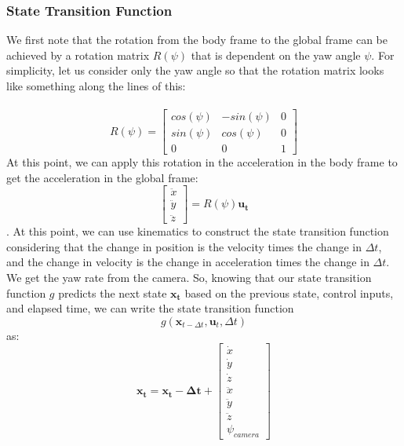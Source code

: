 \documentclass{article}
\begin{document}
\subsubsection{State Transition Function}
We first note that the rotation from the body frame to the global frame can be achieved by a rotation matrix $R(\psi)$ that is dependent on the yaw angle $\psi$. For simplicity, let us consider only the yaw angle so that the rotation matrix looks like something along the lines of this: \\ \\
\begin{equation}
R(\psi) =
\begin{bmatrix}
cos(\psi) & -sin(\psi) & 0 \\
sin(\psi) & cos(\psi) & 0 \\
0 & 0 & 1
\end{bmatrix}
\end{equation}
At this point, we can apply this rotation in the acceleration in the body frame to get the acceleration in the global frame: \\
\begin{equation}
\begin{bmatrix}
\ddot x \\
\ddot y \\
\ddot z
\end{bmatrix}  = R(\psi)\mathbf{u_t}
\end{equation}. At this point, we can use kinematics to construct the state transition function considering that the change in position is the velocity times the change in $\Delta t$, and the change in velocity is the change in acceleration times the change  in $\Delta t$. We get the yaw rate from the camera. So, knowing that our state transition function $g$ predicts the next state $\mathbf{x_t}$ based on the previous state, control inputs, and elapsed time, we can write the state transition function 
\begin{equation}
  g(\mathbf{x}_{t-\Delta t}, \mathbf{u}_t, \Delta t)
\end{equation} as: \\
\begin{equation}
    \mathbf{x_t} = \mathbf{x_t - \Delta t} + \begin{bmatrix}
    \dot x \\
    \dot y \\
    \dot z \\
    \ddot x \\
    \ddot y \\
    \ddot z \\
    \psi_{\textit{camera}}
\end{bmatrix}
\end{equation}
\end{document}
